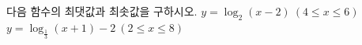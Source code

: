 다음 함수의 최댓값과 최솟값을 구하시오.
 $y=\log_2 (x-2)\ (4\le x\le 6)$
 $y=\log_{\frac{1}{3}} (x+1)-2\ (2\le x\le 8)$
